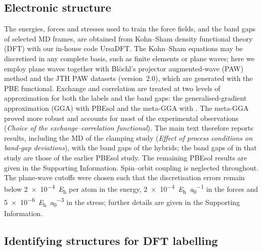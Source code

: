 \subsection{Electronic structure}
\label{sec:dft}

{\changedcolor
The energies, forces and stresses used to train the force fields, and the band gaps of selected MD frames, are
obtained from Kohn--Sham density functional theory (DFT) with our in-house code UrsaDFT. The Kohn--Sham equations may
be discretised in any complete basis, such as finite elements or plane waves; here we employ plane waves together with
Bl\"ochl's projector augmented-wave (PAW) method\cite{Blochl1994PAW} and the JTH PAW datasets
(version~2.0),\cite{Jollet2014CPC, JTHv2web} which are generated with the PBE functional. Exchange and correlation are
treated at two levels of approximation for both the labels and the band gaps: the generalised-gradient approximation
(GGA) with PBEsol\cite{Perdew2008PBEsol} and the meta-GGA with \rSCAN{}.\cite{Furness2020r2SCAN} The \rSCAN{}
meta-GGA proved more robust and accounts for most of the experimental observations
(\emph{Choice of the exchange--correlation functional}). The main text therefore reports \rSCAN{} results, including the MD of the
clamping study (\emph{Effect of process conditions on band-gap deviations}), with the band gaps of the hybrids; the band gaps of \CsSnI{} in that study are those of the earlier PBEsol study. The remaining PBEsol results are given
in the Supporting Information. Spin--orbit coupling is neglected throughout. The plane-wave cutoffs were chosen such
that the discretisation errors remain below \SI{2e-4}{\hartree} per atom in the energy,
\SI{2e-4}{\hartree\per\bohr} in the forces and \SI{5e-6}{\hartree\per\bohr\cubed} in the stress; further details are
given in the Supporting Information.
}

\subsection{Identifying structures for DFT labelling}
\label{sec:data}

